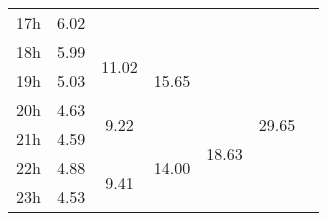 \begin{center}
\begin{tabular}{| l || c | c | c | c | c | c |}
17h & \multirow{1}{*}{ 6.02 }  & & & & & \\\cline{2-2}\cline{3-3}\cline{4-4}\cline{6-6}
18h & \multirow{1}{*}{ 5.99 }  & \multirow{2}{*}{ 11.02 }  & \multirow{3}{*}{ 15.65 }  & & \multirow{6}{*}{ 29.65 }  & \\\cline{2-2}
19h & \multirow{1}{*}{ 5.03 }  & & & & & \\\cline{2-2}\cline{3-3}\cline{5-5}
20h & \multirow{1}{*}{ 4.63 }  & \multirow{2}{*}{ 9.22 }  & & \multirow{4}{*}{ 18.63 }  & & \\\cline{2-2}\cline{4-4}
21h & \multirow{1}{*}{ 4.59 }  & & \multirow{3}{*}{ 14.00 }  & & & \\\cline{2-2}\cline{3-3}
22h & \multirow{1}{*}{ 4.88 }  & \multirow{2}{*}{ 9.41 }  & & & & \\\cline{2-2}
23h & \multirow{1}{*}{ 4.53 }  & & & & & \\\cline{2-2}\cline{3-3}\cline{4-4}\cline{5-5}\cline{6-6}\cline{7-7}
\hline\end{tabular}
\end{center}